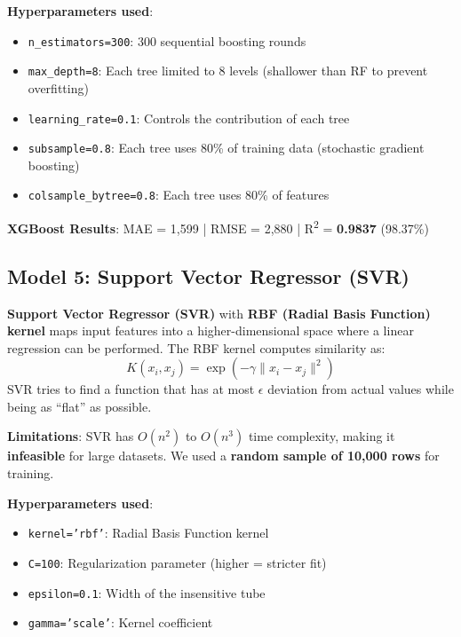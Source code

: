 \documentclass[12pt, a4paper]{article}
\newcommand{\rupee}{\text{₹}}
\begin{document}
\textbf{Hyperparameters used}:
\begin{itemize}[leftmargin=*]
    \item \texttt{n\_estimators=300}: 300 sequential boosting rounds
    \item \texttt{max\_depth=8}: Each tree limited to 8 levels (shallower than RF to prevent overfitting)
    \item \texttt{learning\_rate=0.1}: Controls the contribution of each tree
    \item \texttt{subsample=0.8}: Each tree uses 80\% of training data (stochastic gradient boosting)
    \item \texttt{colsample\_bytree=0.8}: Each tree uses 80\% of features
\end{itemize}

\begin{resultbox}
\textbf{XGBoost Results}: MAE = \rupee1,599 \quad | \quad RMSE = \rupee2,880 \quad | \quad R\textsuperscript{2} = \textbf{0.9837} (98.37\%)
\end{resultbox}

\subsection{Model 5: Support Vector Regressor (SVR)}

\begin{keyterm}
\textbf{Support Vector Regressor (SVR)} with \textbf{RBF (Radial Basis Function) kernel} maps input features into a higher-dimensional space where a linear regression can be performed. The RBF kernel computes similarity as:
\[
    K(x_i, x_j) = \exp\left(-\gamma \|x_i - x_j\|^2\right)
\]
SVR tries to find a function that has at most $\epsilon$ deviation from actual values while being as ``flat'' as possible.
\end{keyterm}

\textbf{Limitations}: SVR has $O(n^2)$ to $O(n^3)$ time complexity, making it \textbf{infeasible} for large datasets. We used a \textbf{random sample of 10,000 rows} for training.

\textbf{Hyperparameters used}:
\begin{itemize}[leftmargin=*]
    \item \texttt{kernel='rbf'}: Radial Basis Function kernel
    \item \texttt{C=100}: Regularization parameter (higher = stricter fit)
    \item \texttt{epsilon=0.1}: Width of the insensitive tube
    \item \texttt{gamma='scale'}: Kernel coefficient
\end{itemize}
\end{document}
